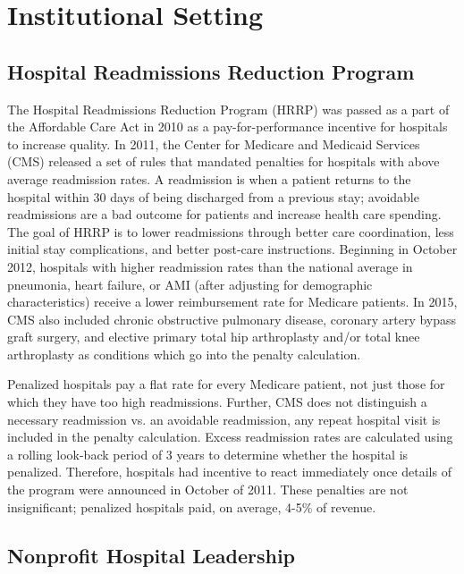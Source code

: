 \documentclass[12pt]{article}
\begin{document}
    

    \section{Institutional Setting}

    \subsection{Hospital Readmissions Reduction Program}\label{sec:hrrp}

    The Hospital Readmissions Reduction Program (HRRP) was passed as a part of the Affordable Care Act in 2010 as a pay-for-performance incentive for hospitals to increase quality. In 2011, the Center for Medicare and Medicaid Services (CMS) released a set of rules that mandated penalties for hospitals with above average readmission rates. A readmission is when a patient returns to the hospital within 30 days of being discharged from a previous stay; avoidable readmissions are a bad outcome for patients and increase health care spending. The goal of HRRP is to lower readmissions through better care coordination, less initial stay complications, and better post-care instructions. Beginning in October 2012, hospitals with higher readmission rates than the national average in pneumonia, heart failure, or AMI (after adjusting for demographic characteristics) receive a lower reimbursement rate for Medicare patients. In 2015, CMS also included chronic obstructive pulmonary disease, coronary artery bypass graft surgery, and elective primary total hip arthroplasty and/or total knee arthroplasty as conditions which go into the penalty calculation. 
    
    Penalized hospitals pay a flat rate for every Medicare patient, not just those for which they have too high readmissions. Further, CMS does not distinguish a necessary readmission vs. an avoidable readmission, any repeat hospital visit is included in the penalty calculation. Excess readmission rates are calculated using a rolling look-back period of 3 years to determine whether the hospital is penalized. Therefore, hospitals had incentive to react immediately once details of the program were announced in October of 2011. These penalties are not insignificant; penalized hospitals paid, on average, 4-5\% of revenue. 

    \subsection{Nonprofit Hospital Leadership}
\end{document}
